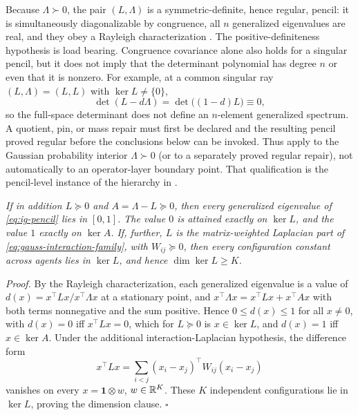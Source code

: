 \medskip
Because $\Lambda\succ0$, the pair $(L,\Lambda)$ is a symmetric-definite, hence regular, pencil: it is simultaneously diagonalizable by congruence, all $n$ generalized eigenvalues are real, and they obey a Rayleigh characterization \citep{HornJohnson2013,GolubVanLoan2013}. The positive-definiteness hypothesis is load bearing. Congruence covariance alone also holds for a singular pencil, but it does not imply that the determinant polynomial has degree $n$ or even that it is nonzero. For example, at a common singular ray $(L,\Lambda)=(L,L)$ with $\ker L\neq\{0\}$,
\[
\det(L-d\Lambda)=\det\bigl((1-d)L\bigr)\equiv0,
\]
so the full-space determinant does not define an $n$-element generalized spectrum. A quotient, pin, or mass repair must first be declared and the resulting pencil proved regular before the conclusions below can be invoked. Thus  apply to the Gaussian probability interior $\Lambda\succ0$ (or to a separately proved regular repair), not automatically to an operator-layer boundary point. That qualification is the pencil-level instance of the hierarchy in .

\medskip
{}
\emph{If in addition $L\succeq0$ and $A=\Lambda-L\succeq0$, then every generalized eigenvalue of \eqref{eq:ig-pencil} lies in $[0,1]$. The value $0$ is attained exactly on $\ker L$, and the value $1$ exactly on $\ker A$. If, further, $L$ is the matrix-weighted Laplacian part of \eqref{eq:gauss-interaction-family}, with $W_{ij}\succeq0$, then every configuration constant across agents lies in $\ker L$, and hence $\dim\ker L\geq K$.}

\noindent\emph{Proof.} By the Rayleigh characterization, each generalized eigenvalue is a value of $d(x)=x^\top Lx/x^\top\Lambda x$ at a stationary point, and $x^\top\Lambda x=x^\top Lx+x^\top Ax$ with both terms nonnegative and the sum positive. Hence $0\le d(x)\le1$ for all $x\neq0$, with $d(x)=0$ iff $x^\top Lx=0$, which for $L\succeq0$ is $x\in\ker L$, and $d(x)=1$ iff $x\in\ker A$. Under the additional interaction-Laplacian hypothesis, the difference form
\[
x^\top Lx=\sum_{i<j}\left(x_i-x_j\right)^\top W_{ij}\left(x_i-x_j\right)
\]
vanishes on every $x=\mathbf1\otimes w$, $w\in\mathbb R^K$. These $K$ independent configurations lie in $\ker L$, proving the dimension clause. \hfill$\square$

